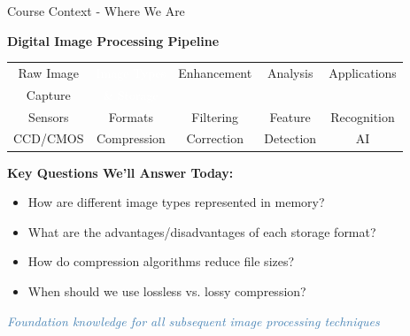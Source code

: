 \documentclass[aspectratio=1610,8pt]{beamer}
\begin{document}
\begin{frame}{Course Context - Where We Are}
\begin{center}
\textbf{Digital Image Processing Pipeline}
\end{center}

\begin{center}
\begin{tabular}{|c|c|c|c|c|}
\hline
Raw Image & \cellcolor{steelblue}\textcolor{white}{Image Types} & Enhancement & Analysis & Applications \\
Capture & \cellcolor{steelblue}\textcolor{white}{\& Storage} & & & \\
\hline
Sensors & Formats & Filtering & Feature & Recognition \\
CCD/CMOS & Compression & Correction & Detection & AI \\
\hline
\end{tabular}
\end{center}

\vspace{0.5cm}
\textbf{Key Questions We'll Answer Today:}
\begin{itemize}
    \item How are different image types represented in memory?
    \item What are the advantages/disadvantages of each storage format?
    \item How do compression algorithms reduce file sizes?
    \item When should we use lossless vs. lossy compression?
\end{itemize}

\begin{center}
\textcolor{steelblue}{\textit{Foundation knowledge for all subsequent image processing techniques}}
\end{center}
\end{frame}
\end{document}
